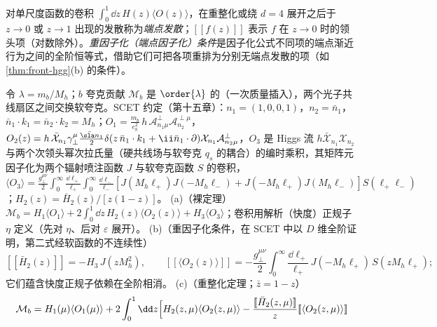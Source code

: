 \begin{definition}[端点发散与重因子化条件]\label{def:front-endpoint}
对单尺度函数的卷积 $\int_0^1\dd z\,H(z)\langle O(z)\rangle$，在重整化或绕 $d=4$ 展开之后于 $z\to0$ 或 $z\to1$ 出现的发散称为\emph{端点发散}；$[\![f(z)]\!]$ 表示 $f$ 在 $z\to0$ 时的领头项（对数除外）。\emph{重因子化（端点因子化）条件}是因子化公式不同项的端点渐近行为之间的全阶恒等式，借助它们可把各项重排为分别无端点发散的项（如\cref{thm:front-hgg}(b) 的条件）。
\end{definition}

\begin{theorem}\label{thm:front-hgg}
令 $\lambda=m_b/M_h$；$b$ 夸克贡献 $\mathcal M_b$ 是 $\order{\lambda}$ 的（一次质量插入），两个光子共线扇区之间交换软夸克。SCET 约定（第十五章）：$n_1=(1,0,0,1)$，$n_2=\bar n_1$，$\bar n_1\cdot k_1=\bar n_2\cdot k_2=M_h$；$O_1=\frac{m_b}{e_b^2}\,h\,\mathcal A^\perp_{n_1\mu}\mathcal A^{\perp\mu}_{n_2}$，$O_2(z)=h\,\bar{\mathcal X}_{n_1}\gamma_\perp^\mu\frac{\bar{\sla n}_1}{2}\delta(z\,\bar n_1\cdot k_1+\ii\bar n_1\cdot\partial)\mathcal X_{n_1}\mathcal A^\perp_{n_2\mu}$，$O_3$ 是 Higgs 流 $h\bar{\mathcal X}_{n_1}\mathcal X_{n_2}$ 与两个次领头幂次拉氏量（硬共线场与软夸克 $q_s$ 的耦合）的编时乘积，其矩阵元因子化为两个辐射喷注函数 $J$ 与软夸克函数 $S$ 的卷积，$\langle O_3\rangle=\frac{g_\perp^{\mu\nu}}2\int_0^\infty\frac{\dd\ell_+}{\ell_+}\int_0^\infty\frac{\dd\ell_-}{\ell_-}[J(M_h\ell_+)J(-M_h\ell_-)+J(-M_h\ell_+)J(M_h\ell_-)]S(\ell_+\ell_-)$；$H_2(z)=\bar H_2(z)/[z(1-z)]$。
(a)（裸定理）$\mathcal M_b=H_1\langle O_1\rangle+2\int_0^1\dd z\,H_2(z)\langle O_2(z)\rangle+H_3\langle O_3\rangle$；卷积用解析（快度）正规子 $\eta$ 定义（先对 $\eta$、后对 $\varepsilon$ 展开）\cite{Liu:2019oav}。
(b)（重因子化条件，在 SCET 中以 $D$ 维全阶证明，第二式经软函数的不连续性\cite[第~3~节]{Liu:2020wbn}）
\begin{equation}\label{eq:front-refact}
[\![\bar H_2(z)]\!]=-H_3\,J(zM_h^2),\qquad
[\![\langle O_2(z)\rangle]\!]=-\frac{g_\perp^{\mu\nu}}2\int_0^\infty\frac{\dd\ell_+}{\ell_+}\,J(-M_h\ell_+)\,S(zM_h\ell_+);
\end{equation}
它们蕴含快度正规子依赖在全阶相消。
(c)（重整化定理\cite[式~(4.1)]{Liu:2020wbn}；$\bar z=1-z$）
\begin{equation}\label{eq:front-hgg-ren}
\begin{split}
\mathcal M_b&=H_1(\mu)\langle O_1(\mu)\rangle+2\int_0^1\dd z\Bigl[H_2(z,\mu)\langle O_2(z,\mu)\rangle-\frac{[\![\bar H_2(z,\mu)]\!]}{z}[\![\langle O_2(z,\mu)\rangle]\!]\\

\end{split}
\end{equation}
\end{theorem}
